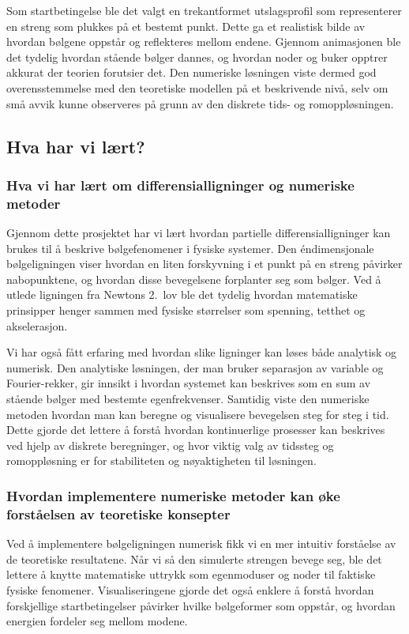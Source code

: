 Som startbetingelse ble det valgt en trekantformet utslagsprofil som representerer en streng som plukkes på et bestemt punkt. Dette ga et realistisk bilde av hvordan bølgene 
oppstår og reflekteres mellom endene. Gjennom animasjonen ble det tydelig hvordan stående bølger dannes, og hvordan noder og buker opptrer akkurat der teorien forutsier det. 
Den numeriske løsningen viste dermed god overensstemmelse med den teoretiske modellen på et beskrivende nivå, selv om små avvik kunne observeres på grunn av den diskrete tids- og romoppløsningen.

\subsection{Hva har vi lært?}
\subsubsection{Hva vi har lært om differensialligninger og numeriske metoder}

Gjennom dette prosjektet har vi lært hvordan partielle differensialligninger kan brukes til å beskrive bølgefenomener i fysiske systemer. Den éndimensjonale bølgeligningen viser 
hvordan en liten forskyvning i et punkt på en streng påvirker nabopunktene, og hvordan disse bevegelsene forplanter seg som bølger. Ved å utlede ligningen fra Newtons 2.~lov ble det tydelig 
hvordan matematiske prinsipper henger sammen med fysiske størrelser som spenning, tetthet og akselerasjon. 

Vi har også fått erfaring med hvordan slike ligninger kan løses både analytisk og numerisk. Den analytiske løsningen, der man bruker separasjon av variable og Fourier-rekker, gir innsikt 
i hvordan systemet kan beskrives som en sum av stående bølger med bestemte egenfrekvenser. Samtidig viste den numeriske metoden hvordan man kan beregne og visualisere bevegelsen steg for steg i tid. 
Dette gjorde det lettere å forstå hvordan kontinuerlige prosesser kan beskrives ved hjelp av diskrete beregninger, og hvor viktig valg av tidssteg og romoppløsning er for stabiliteten og nøyaktigheten til løsningen.

\subsubsection{Hvordan implementere numeriske metoder kan øke forståelsen av teoretiske konsepter}

Ved å implementere bølgeligningen numerisk fikk vi en mer intuitiv forståelse av de teoretiske resultatene. Når vi så den simulerte strengen bevege seg, ble det lettere å knytte 
matematiske uttrykk som egenmoduser og noder til faktiske fysiske fenomener. Visualiseringene gjorde det også enklere å forstå hvordan forskjellige startbetingelser påvirker hvilke bølgeformer som oppstår, 
og hvordan energien fordeler seg mellom modene. 

